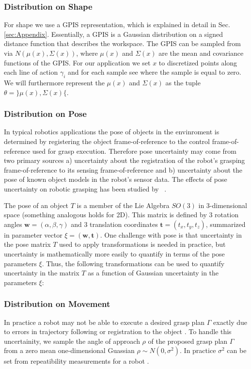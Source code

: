 \documentclass[letterpaper, 10 pt, conference]{ieeeconf}  %
\newcommand{\bw}{\mathbf{w}}
\newcommand{\bt}{\mathbf{t}}
\begin{document}
\subsubsection{Distribution on Shape}

For shape we use a GPIS representation, which is explained in detail in Sec. \ref{sec:Appendix}. Essentially, a GPIS is a Gaussian distribution on a signed distance function that describes the workspace. The GPIS can be sampled from via $N(\mu(x),\Sigma(x))$, where $\mu(x)$ and $\Sigma(x)$ are the mean and covariance functions of the GPIS. For our application we set $x$ to discretized points along each line of action $\gamma_i$ and for each sample see where the sample is equal to zero.  We will furthermore represent the $\mu(x)$ and $\Sigma(x)$ as the tuple $\theta = \rbrace\mu(x), \Sigma(x)\lbrace$. 

\subsubsection{Distribution on Pose}
In typical robotics applications the pose of objects in the envinroment is determined by registering the object frame-of-reference to the control frame-of-reference used for grasp execution.
Therefore pose uncertainty may come from two primary sources a) uncertainty about the registration of the robot's grasping frame-of-reference to its sensing frame-of-reference and b) uncertainty about the pose of known object models in the robot's sensor data.
The effects of pose uncertainty on robotic grasping has been studied by ~\cite{}.

The pose of an object $T$ is a member of the Lie Algebra $SO(3)$ in 3-dimensional space (something analogous holds for 2D).
This matrix is defined by 3 rotation angles $\bw = (\alpha, \beta, \gamma)$ and 3 translation coordinates $\bt = (t_x, t_y, t_z)$, summarized in parameter vector $\xi = (\bw, \bt)$.
One challenge with pose is that uncertainty in the pose matrix $T$ used to apply transformations is needed in practice, but uncertainty is mathematically more easily to quantify in terms of the pose parameters $\xi$.
Thus, the following transformations can be used to quantify uncertainty in the matrix $T$ as a function of Gaussian uncertainty in the parameters $\xi$:

 
 \subsubsection{Distribution on Movement}
 In practice a robot may not be able to execute a desired
grasp plan $\Gamma$ exactly due to errors in trajectory following or
registration to the object \cite{kehoe2012estimating}. To handle this uncertainity, we sample the angle of approach $\rho$ of the proposed grasp plan $\Gamma$ from a zero mean one-dimensional Guassian $\rho \sim N(0,\sigma^2)$. In practice $\sigma^2$ can be set from repeatibility measurements for a robot \cite{mooring1986determination}.
\end{document}
